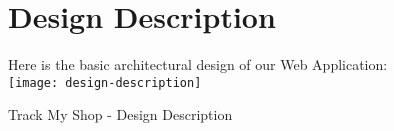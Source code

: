 \pagebreak

\begin{figure}[h]
	\section{Design Description}
	Here is the basic architectural design of our Web Application:\\
	\vspace{2cm}
	\centering
	\texttt{[image: design-description]}
	\caption{Track My Shop - Design Description}
\end{figure}
\pagebreak


